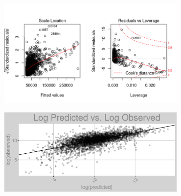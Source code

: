 \begin{figure}[h]
\centering
\begin{subfigure}{1\textwidth}
\centering
\includegraphics[width=.99\textwidth, height=0.475\textheight]{Images/natural_gas_psf_pls_res_2.png}
\end{subfigure}
\begin{subfigure}{1\textwidth}
\centering
\includegraphics[width=.99\textwidth, height=0.3\textheight]{Images/natural_gas_psf_pls_pvo.png}
\end{subfigure}
\end{figure}
\FloatBarrier
\newpage
